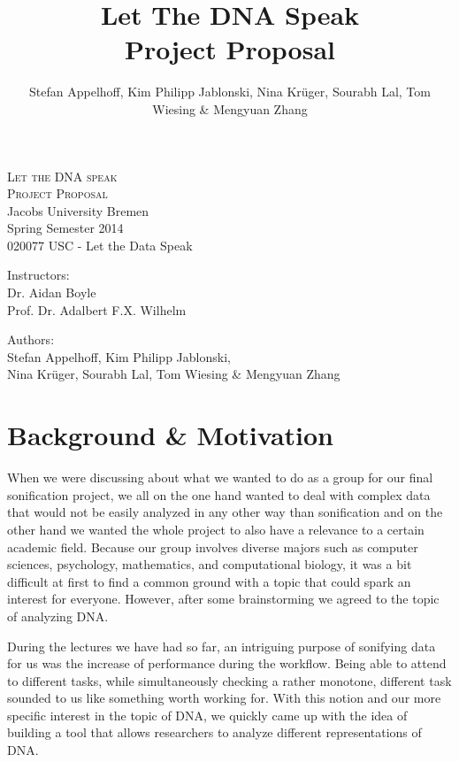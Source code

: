 \documentclass[10pt]{article}
\title{Let The DNA Speak\\Project Proposal}
\author{Stefan Appelhoff, Kim Philipp Jablonski, Nina Krüger, Sourabh Lal, Tom Wiesing \& Mengyuan Zhang}
\begin{document}
\begin{titlepage}
\thispagestyle{empty}
\begin{center}

\textsc{\huge Let the DNA speak}\\[2cm]
\textsc{\Huge Project Proposal}\\[6cm]

\Large{Jacobs University Bremen\\
Spring Semester 2014\\020077 USC - Let the Data Speak}
\vspace*{1.2cm}

\Large{Instructors:\\Dr. Aidan Boyle\\Prof. Dr. Adalbert F.X. Wilhelm}
\vspace*{1.2cm}

\Large{Authors:\\Stefan Appelhoff, Kim Philipp Jablonski, \\Nina Krüger, Sourabh Lal, Tom Wiesing \& Mengyuan Zhang}
\vspace*{1.2cm}

\end{center}

\end{titlepage}


\clearpage
\thispagestyle{empty}
\tableofcontents
\newpage

\setcounter{page}{1}
\section{Background \& Motivation}

When we were discussing about what we wanted to do as a group for our final sonification project, we all on the one hand wanted to deal with complex data that would not be easily analyzed in any other way than sonification and on the other hand we wanted the whole project to also have a relevance to a certain academic field. Because our group involves diverse majors such as computer sciences, psychology, mathematics, and computational biology, it was a bit difficult at first to find a common ground with a topic that could spark an interest for everyone. However, after some brainstorming we agreed to the topic of analyzing DNA.

During the lectures we have had so far, an intriguing purpose of sonifying data for us was the increase of performance during the workflow. Being able to attend to different tasks, while simultaneously checking a rather monotone, different task sounded to us like something worth working for. With this notion and our more specific interest in the topic of DNA, we quickly came up with the idea of building a tool that allows researchers to analyze different representations of DNA.
\end{document}
